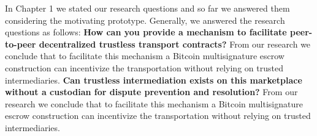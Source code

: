 In Chapter 1 we stated our research questions and so far we answered them considering the motivating prototype. Generally, we answered the research questions as follows:
\bigbreak
\noindent \textbf{How can you provide a mechanism to facilitate peer-to-peer decentralized trustless transport contracts?} From our research we conclude that to facilitate this mechanism a Bitcoin multisignature escrow construction can incentivize the transportation without relying on trusted intermediaries.
\bigbreak
\noindent \textbf{Can trustless intermediation exists on this marketplace without a custodian for dispute prevention and resolution?} From our research we conclude that to facilitate this mechanism a Bitcoin multisignature escrow construction can incentivize the transportation without relying on trusted intermediaries.

